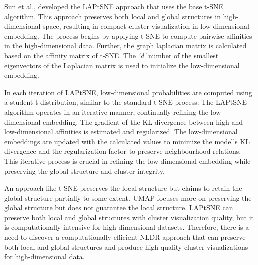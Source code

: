 Sun et al., \cite{sun2023laplacian} developed the LAPtSNE approach that uses the base t-SNE algorithm. This approach preserves both local and global structures in high-dimensional space, resulting in compact cluster visualization in low-dimensional embedding. The process begins by applying t-SNE to compute pairwise affinities in the high-dimensional data. Further, the graph laplacian matrix is calculated based on the affinity matrix of t-SNE. The \textit{`d'} number of the smallest eigenvectors of the Laplacian matrix is used to initialize the low-dimensional embedding. 

In each iteration of LAPtSNE, low-dimensional probabilities are computed using a student-t distribution, similar to the standard t-SNE process. The LAPtSNE algorithm operates in an iterative manner, continually refining the low-dimensional embedding. The gradient of the KL divergence between high and low-dimensional affinities is estimated and regularized. The low-dimensional embeddings are updated with the calculated values to minimize the model’s KL divergence and the regularization factor to preserve neighbourhood relations. This iterative process is crucial in refining the low-dimensional embedding while preserving the global structure and cluster integrity.


An approach like t-SNE \cite{tsne} preserves the local structure but claims to retain the global structure partially to some extent. UMAP \cite{umap_reference} focuses more on preserving the global structure but does not guarantee the local structure. LAPtSNE \cite{sun2023laplacian} can preserve both local and global structures with cluster visualization quality, but it is computationally intensive for high-dimensional datasets.  Therefore, there is a need to discover a computationally efficient NLDR approach that can preserve both local and global structures and produce high-quality cluster visualizations for high-dimensional data.
